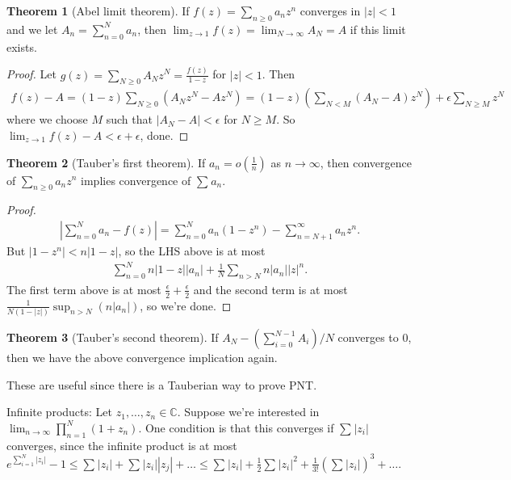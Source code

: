 \documentclass{article}
\theoremstyle{definition}
\newtheorem{theorem}{Theorem}[section]
\begin{document}
\begin{theorem}[Abel limit theorem]
    If $f(z) = \sum_{n\ge 0}^{} a_n z^n$ converges in $|z|<1$ and we let $A_n = \sum_{n=0}^{N} a_n$, then $\lim_{z \to 1} f(z) = \lim_{N \to \infty} A_N = A$ if this limit exists.
\end{theorem}
\begin{proof}
    Let $g(z) = \sum_{N\ge 0}^{} A_N z^N = \frac{f(z)}{1-z}$ for $|z|<1$. Then 
    \begin{align*}
        f(z) - A = (1-z)\sum_{N\ge 0}^{} (A_Nz^N - Az^N) = (1-z)\left(\sum_{N<M}^{} (A_N-A)z^N\right) + \epsilon\sum_{N\ge M}^{} z^N
    \end{align*}
    where we choose $M$ such that $|A_N - A| < \epsilon$ for $N\ge M$.
    So $\lim_{z \to 1}f(z)-A < \epsilon + \epsilon$, done.
\end{proof}
\begin{theorem}[Tauber's first theorem]
    If $a_n = o(\frac{1}{n})$ as $n \to \infty$, then convergence of  $\sum_{n \ge 0}^{} a_n z^n$ implies convergence of $\sum_{}^{} a_n$.
\end{theorem}
\begin{proof}
    \begin{align*}
        \left |\sum_{n=0}^{N} a_n-f(z)\right | = \sum_{n=0}^{N} a_n(1-z^n) - \sum_{n=N+1}^{\infty} a_nz^n.
    \end{align*}
    But $|1-z^n| < n|1-z|$, so the LHS above is at most 
    \begin{align*}
        \sum_{n=0}^{N} n|1-z||a_n| + \frac{1}{N}\sum_{n>N}^{} n |a_n||z|^n.
    \end{align*}
    The first term above is at most $\frac{\epsilon}{2}+\frac{\epsilon}{2}$ and the second term is at most $\frac{1}{N(1-|z|)} \sup_{n>N} (n|a_n|)$, so we're done.
\end{proof}
\begin{theorem}[Tauber's second theorem]
    If $A_N - (\sum_{i=0}^{N-1} A_i)/N$ converges to 0, then we have the above convergence implication again.
\end{theorem}
These are useful since there is a Tauberian way to prove PNT.
\vspace{1mm}

Infinite products: Let $z_1,\ldots, z_n \in \mathbb{C}$. Suppose we're interested in $\lim_{n \to \infty} \prod_{n=1}^{N} (1+z_n)$. One condition is that this converges if $\sum_{}^{} |z_i|$ converges, since the infinite product is at most $e^{\sum_{i=1}^{N} |z_i|} -1 \le \sum_{}^{} |z_i| + \sum_{}^{} |z_i||z_j| + \ldots \le \sum_{}^{} |z_i| + \frac{1}{2}\sum_{}^{} |z_i|^2 + \frac{1}{3!}(\sum_{}^{} |z_i|)^3 + \ldots$.
\end{document}
